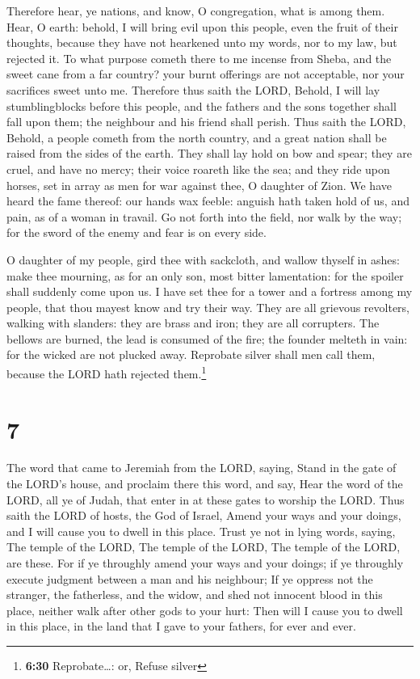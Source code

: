  Therefore hear, ye nations, and know, O congregation,
what is among them.  Hear, O earth: behold, I will bring
evil upon this people, even the fruit of their thoughts, because they
have not hearkened unto my words, nor to my law, but rejected it.
 To what purpose cometh there to me incense from Sheba,
and the sweet cane from a far country? your burnt offerings are not
acceptable, nor your sacrifices sweet unto me.  Therefore
thus saith the LORD, Behold, I will lay stumblingblocks before this
people, and the fathers and the sons together shall fall upon them; the
neighbour and his friend shall perish.  Thus saith the
LORD, Behold, a people cometh from the north country, and a great nation
shall be raised from the sides of the earth.  They shall
lay hold on bow and spear; they are cruel, and have no mercy; their
voice roareth like the sea; and they ride upon horses, set in array as
men for war against thee, O daughter of Zion.  We have
heard the fame thereof: our hands wax feeble: anguish hath taken hold of
us, and pain, as of a woman in travail.  Go not forth
into the field, nor walk by the way; for the sword of the enemy and fear
is on every side.

 O daughter of my people, gird thee with sackcloth, and
wallow thyself in ashes: make thee mourning, as for an only son, most
bitter lamentation: for the spoiler shall suddenly come upon us.
 I have set thee for a tower and a fortress among my
people, that thou mayest know and try their way.  They
are all grievous revolters, walking with slanders: they are brass and
iron; they are all corrupters.  The bellows are burned,
the lead is consumed of the fire; the founder melteth in vain: for the
wicked are not plucked away.  Reprobate silver shall men
call them, because the LORD hath rejected them.\footnote{\textbf{6:30}
  Reprobate\ldots: or, Refuse silver}

\hypertarget{section-6}{%
\section{7}\label{section-6}}

 The word that came to Jeremiah from the LORD, saying,
 Stand in the gate of the LORD's house, and proclaim there
this word, and say, Hear the word of the LORD, all ye of Judah, that
enter in at these gates to worship the LORD.  Thus saith
the LORD of hosts, the God of Israel, Amend your ways and your doings,
and I will cause you to dwell in this place.  Trust ye not
in lying words, saying, The temple of the LORD, The temple of the LORD,
The temple of the LORD, are these.  For if ye throughly
amend your ways and your doings; if ye throughly execute judgment
between a man and his neighbour;  If ye oppress not the
stranger, the fatherless, and the widow, and shed not innocent blood in
this place, neither walk after other gods to your hurt: 
Then will I cause you to dwell in this place, in the land that I gave to
your fathers, for ever and ever.

